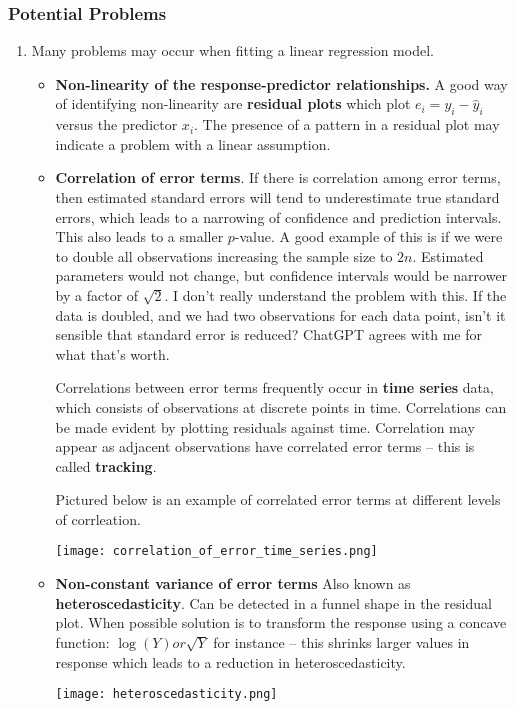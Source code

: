\documentclass[10pt]{article}
\begin{document}
\subsubsection{Potential Problems} 
\begin{enumerate}
	\item Many problems may occur when fitting a linear regression model.
	\begin{itemize}
		\item \textbf{Non-linearity of the response-predictor relationships.}  A good way of identifying non-linearity are \textbf{residual plots} which plot $e_i = y_i - \hat y_i$ versus the predictor $x_i$.  The presence of a pattern in a residual plot may indicate a problem with a linear assumption.
		\item \textbf{Correlation of error terms}.  If there is correlation among error terms, then estimated standard errors will tend to underestimate true standard errors, which leads to a narrowing of confidence and prediction intervals.  This also leads to a smaller $p$-value.  A good example of this is if we were to double all observations increasing the sample size to $2n$.  Estimated parameters would not change, but confidence intervals would be narrower by a factor of $\sqrt{2}$. {\color{brown} I don't really understand the problem with this.  If the data is doubled, and we had two observations for each data point, isn't it sensible that standard error is reduced?  ChatGPT agrees with me for what that's worth.}
		
		Correlations between error terms frequently occur in \textbf{time series} data, which consists of observations at discrete points in time.  Correlations can be made evident by plotting residuals against time.  Correlation may appear as adjacent observations have correlated error terms -- this is called \textbf{tracking}.
		
		Pictured below is an example of correlated error terms at different levels of corrleation.
		
		\texttt{[image: correlation\_of\_error\_time\_series.png]}
		\item \textbf{Non-constant variance of error terms} Also known as \textbf{heteroscedasticity}.  Can be detected in a funnel shape in the residual plot.  When possible solution is to transform the response using a concave function: $\log(Y) or \sqrt{Y}$ for instance -- this shrinks larger values in response which leads to a reduction in heteroscedasticity.
		
		\texttt{[image: heteroscedasticity.png]}
		

\end{itemize}
\end{enumerate}
\end{document}
